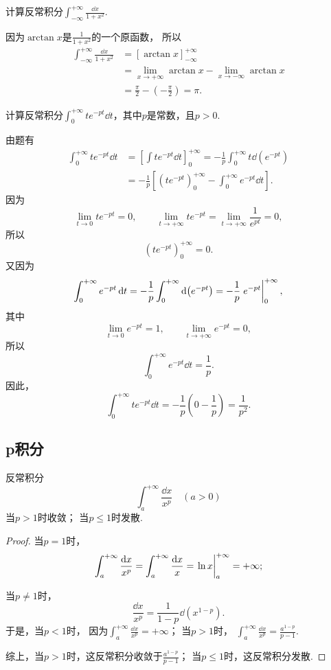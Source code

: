 \begin{example}
计算反常积分\(\int_{-\infty}^{+\infty} \frac{\dd{x}}{1+x^2}\).
\begin{solution}
因为\(\arctan x\)是\(\frac{1}{1+x^2}\)的一个原函数，
所以\[
	\begin{split}
		\int_{-\infty}^{+\infty} \frac{\dd{x}}{1+x^2}
		&= [\arctan x]_{-\infty}^{+\infty} \\
		&= \lim\limits_{x\to+\infty} \arctan x
			-\lim\limits_{x\to-\infty} \arctan x \\
		&= \frac{\pi}{2} - \left(-\frac{\pi}{2}\right) = \pi.
	\end{split}
\]
\end{solution}
\end{example}

\begin{example}
计算反常积分\(\int_0^{+\infty} t e^{-pt} \dd{t}\)，其中\(p\)是常数，且\(p>0\).
\begin{solution}
由题有\begin{align*}
	\int_0^{+\infty} t e^{-pt} \dd{t}
	&= \left[ \int t e^{-pt} \dd{t} \right]_0^{+\infty}
	= -\frac{1}{p} \int_0^{+\infty} t \dd(e^{-pt}) \\
	&= -\frac{1}{p} \left[
			\left( t e^{-pt} \right)_0^{+\infty}
			- \int_0^{+\infty} e^{-pt} \dd{t}
		\right].
\end{align*}
因为\[
	\lim_{t\to0} t e^{-pt} = 0, \qquad
	\lim_{t\to+\infty} t e^{-pt}
	= \lim_{t\to+\infty} \frac{1}{e^{pt}}
	= 0,
\]
所以\[
	\left( t e^{-pt} \right)_0^{+\infty}
	= 0.
\]
又因为\[
	\int_0^{+\infty} e^{-pt} \dd{t}
	= -\frac{1}{p} \int_0^{+\infty} \dd(e^{-pt})
	= -\frac{1}{p} \eval{e^{-pt}}_0^{+\infty},
\]
其中\[
	\lim_{t\to0} e^{-pt} = 1, \qquad
	\lim_{t\to+\infty} e^{-pt} = 0,
\]
所以\[
	\int_0^{+\infty} e^{-pt} \dd{t}
	= \frac{1}{p}.
\]
因此，\[
	\int_0^{+\infty} t e^{-pt} \dd{t}
	= -\frac{1}{p} \left(
			0 - \frac{1}{p}
		\right)
	= \frac{1}{p^2}.
\]
\end{solution}
\end{example}

\subsection{p积分}
\begin{proposition}[p积分]\label{example:定积分.p积分}
反常积分\[
\int_a^{+\infty} \frac{\dd{x}}{x^p} \quad(a>0)
\]
当\(p > 1\)时收敛；
当\(p \leq 1\)时发散.
\begin{proof}
当\(p=1\)时，\[
	\int_a^{+\infty} \frac{\dd{x}}{x^p}
	= \int_a^{+\infty} \frac{\dd{x}}{x}
	= \eval{\ln x}_a^{+\infty}
	= +\infty;
\]

当\(p\neq1\)时，\[
	\frac{\dd{x}}{x^p}
	= \frac{1}{1-p} \dd(x^{1-p}).
\]
于是，当\(p<1\)时，
因为\(\int_a^{+\infty} \frac{\dd{x}}{x^p}
= +\infty\)；
当\(p>1\)时，
\(\int_a^{+\infty} \frac{\dd{x}}{x^p}
= \frac{a^{1-p}}{p-1}\).

综上，当\(p > 1\)时，这反常积分收敛于\(\frac{a^{1-p}}{p-1}\)；
当\(p\leq1\)时，这反常积分发散.
\end{proof}
\end{proposition}

